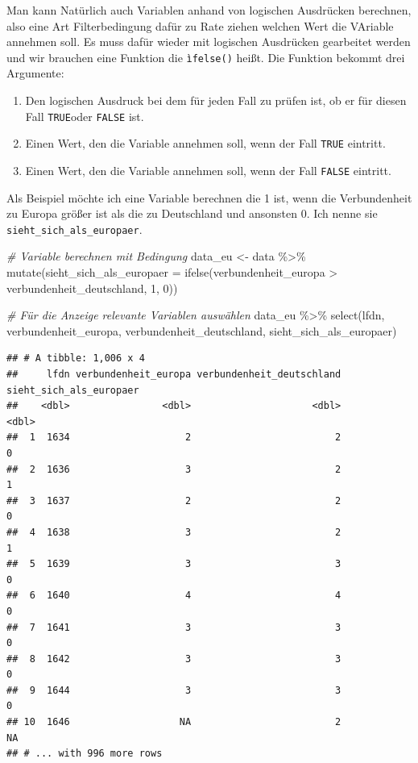 \documentclass[
]{book}
\newenvironment{Shaded}{\begin{snugshade}}{\end{snugshade}}
\newcommand{\AttributeTok}[1]{\textcolor[rgb]{0.77,0.63,0.00}{#1}}
\newcommand{\CommentTok}[1]{\textcolor[rgb]{0.56,0.35,0.01}{\textit{#1}}}
\newcommand{\DecValTok}[1]{\textcolor[rgb]{0.00,0.00,0.81}{#1}}
\newcommand{\FunctionTok}[1]{\textcolor[rgb]{0.00,0.00,0.00}{#1}}
\newcommand{\NormalTok}[1]{#1}
\newcommand{\OtherTok}[1]{\textcolor[rgb]{0.56,0.35,0.01}{#1}}
\newcommand{\SpecialCharTok}[1]{\textcolor[rgb]{0.00,0.00,0.00}{#1}}
\begin{document}
Man kann Natürlich auch Variablen anhand von logischen Ausdrücken berechnen, also eine Art Filterbedingung dafür zu Rate ziehen welchen Wert die VAriable annehmen soll. Es muss dafür wieder mit logischen Ausdrücken gearbeitet werden und wir brauchen eine Funktion die \texttt{ìfelse()} heißt. Die Funktion bekommt drei Argumente:

\begin{enumerate}
\def\labelenumi{\arabic{enumi}.}
\item
  Den logischen Ausdruck bei dem für jeden Fall zu prüfen ist, ob er für diesen Fall \texttt{TRUE}oder \texttt{FALSE} ist.
\item
  Einen Wert, den die Variable annehmen soll, wenn der Fall \texttt{TRUE} eintritt.
\item
  Einen Wert, den die Variable annehmen soll, wenn der Fall \texttt{FALSE} eintritt.
\end{enumerate}

Als Beispiel möchte ich eine Variable berechnen die 1 ist, wenn die Verbundenheit zu Europa größer ist als die zu Deutschland und ansonsten 0. Ich nenne sie \texttt{sieht\_sich\_als\_europaer}.

\begin{Shaded}
\begin{Highlighting}[]
\CommentTok{\# Variable berechnen mit Bedingung}
\NormalTok{data\_eu }\OtherTok{\textless{}{-}}\NormalTok{ data }\SpecialCharTok{\%\textgreater{}\%} 
  \FunctionTok{mutate}\NormalTok{(}\AttributeTok{sieht\_sich\_als\_europaer =} \FunctionTok{ifelse}\NormalTok{(verbundenheit\_europa }\SpecialCharTok{\textgreater{}}\NormalTok{ verbundenheit\_deutschland, }\DecValTok{1}\NormalTok{, }\DecValTok{0}\NormalTok{)) }

\CommentTok{\# Für die Anzeige relevante Variablen auswählen}
\NormalTok{data\_eu }\SpecialCharTok{\%\textgreater{}\%} 
  \FunctionTok{select}\NormalTok{(lfdn, verbundenheit\_europa, verbundenheit\_deutschland, sieht\_sich\_als\_europaer)}
\end{Highlighting}
\end{Shaded}

\begin{verbatim}
## # A tibble: 1,006 x 4
##     lfdn verbundenheit_europa verbundenheit_deutschland sieht_sich_als_europaer
##    <dbl>                <dbl>                     <dbl>                   <dbl>
##  1  1634                    2                         2                       0
##  2  1636                    3                         2                       1
##  3  1637                    2                         2                       0
##  4  1638                    3                         2                       1
##  5  1639                    3                         3                       0
##  6  1640                    4                         4                       0
##  7  1641                    3                         3                       0
##  8  1642                    3                         3                       0
##  9  1644                    3                         3                       0
## 10  1646                   NA                         2                      NA
## # ... with 996 more rows
\end{verbatim}
\end{document}
